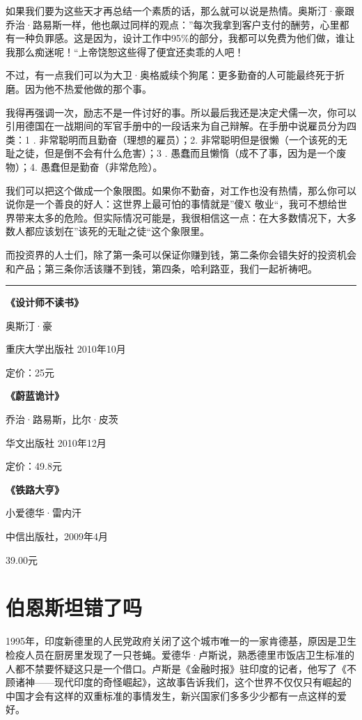 如果我们要为这些天才再总结一个素质的话，那么就可以说是热情。奥斯汀·豪跟乔治·路易斯一样，他也飙过同样的观点：''每次我拿到客户支付的酬劳，心里都有一种负罪感。这是因为，设计工作中95\%的部分，我都可以免费为他们做，谁让我那么痴迷呢！``上帝饶恕这些得了便宜还卖乖的人吧！

不过，有一点我们可以为大卫·奥格威续个狗尾：更多勤奋的人可能最终死于折磨。因为他不热爱他做的那个事。

我得再强调一次，励志不是一件讨好的事。所以最后我还是决定犬儒一次，你可以引用德国在一战期间的军官手册中的一段话来为自己辩解。在手册中说雇员分为四类：1
. 非常聪明而且勤奋（理想的雇员）；2.
非常聪明但是很懒（一个该死的无耻之徒，但是倒不会有什么危害）；3 .
愚蠢而且懒惰（成不了事，因为是一个废物）；4. 愚蠢但是勤奋（非常危险）。

我们可以把这个做成一个象限图。如果你不勤奋，对工作也没有热情，那么你可以说你是一个善良的好人：这世界上最可怕的事情就是''傻X
敬业``，我可不想给世界带来太多的危险。但实际情况可能是，我很相信这一点：在大多数情况下，大多数人都应该划在''该死的无耻之徒``这个象限里。

而投资界的人士们，除了第一条可以保证你赚到钱，第二条你会错失好的投资机会和产品；第三条你活该赚不到钱，第四条，哈利路亚，我们一起祈祷吧。

\begin{center}\rule{3in}{0.4pt}\end{center}

\textbf{《设计师不读书》}

奥斯汀·豪

重庆大学出版社 2010年10月

定价：25元

\textbf{《蔚蓝诡计》}

乔治·路易斯，比尔·皮茨

华文出版社 2010年12月

定价：49.8元

\textbf{《铁路大亨》}

小爱德华·雷内汗

中信出版社，2009年4月

39.00元

\section{伯恩斯坦错了吗}

1995年，印度新德里的人民党政府关闭了这个城市唯一的一家肯德基，原因是卫生检疫人员在厨房里发现了一只苍蝇。爱德华·卢斯说，熟悉德里市饭店卫生标准的人都不禁要怀疑这只是一个借口。卢斯是《金融时报》驻印度的记者，他写了《不顾诸神------现代印度的奇怪崛起》，这故事告诉我们，这个世界不仅仅只有崛起的中国才会有这样的双重标准的事情发生，新兴国家们多多少少都有一点这样的爱好。

